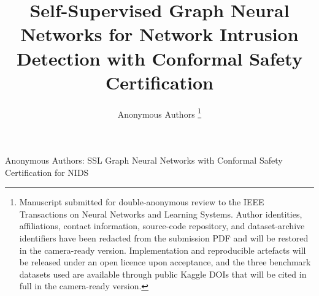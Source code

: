 \documentclass[journal,twoside]{IEEEtran}
\begin{document}
\title{Self-Supervised Graph Neural Networks for Network Intrusion Detection with Conformal Safety Certification}

\author{%
  Anonymous Authors%
  \thanks{Manuscript submitted for double-anonymous review to the IEEE
    Transactions on Neural Networks and Learning Systems. Author
    identities, affiliations, contact information, source-code repository,
    and dataset-archive identifiers have been redacted from the submission
    PDF and will be restored in the camera-ready version. Implementation
    and reproducible artefacts will be released under an open licence upon
    acceptance, and the three benchmark datasets used are available
    through public Kaggle DOIs that will be cited in full in the
    camera-ready version.}%
}

%
{Anonymous Authors: SSL Graph Neural Networks with Conformal Safety Certification for NIDS}

\maketitle
\end{document}
